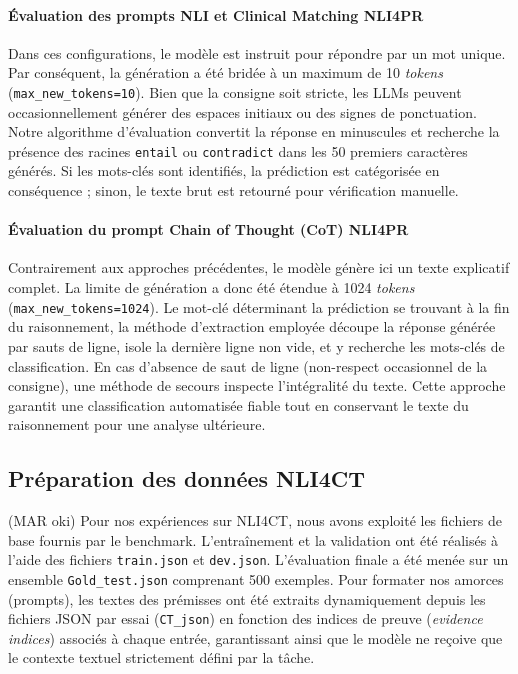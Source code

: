 \paragraph{Évaluation des prompts NLI et Clinical Matching NLI4PR}
Dans ces configurations, le modèle est instruit pour répondre par un mot unique. Par conséquent, la génération a été bridée à un maximum de 10 \textit{tokens} (\texttt{max\_new\_tokens=10}). Bien que la consigne soit stricte, les LLMs peuvent occasionnellement générer des espaces initiaux ou des signes de ponctuation. Notre algorithme d'évaluation convertit la réponse en minuscules et recherche la présence des racines \texttt{entail} ou \texttt{contradict} dans les 50 premiers caractères générés. Si les mots-clés sont identifiés, la prédiction est catégorisée en conséquence ; sinon, le texte brut est retourné pour vérification manuelle.

\paragraph{Évaluation du prompt Chain of Thought (CoT) NLI4PR}
Contrairement aux approches précédentes, le modèle génère ici un texte explicatif complet. La limite de génération a donc été étendue à 1024 \textit{tokens} (\texttt{max\_new\_tokens=1024}). Le mot-clé déterminant la prédiction se trouvant à la fin du raisonnement, la méthode d'extraction employée découpe la réponse générée par sauts de ligne, isole la dernière ligne non vide, et y recherche les mots-clés de classification. En cas d'absence de saut de ligne (non-respect occasionnel de la consigne), une méthode de secours inspecte l'intégralité du texte. Cette approche garantit une classification automatisée fiable tout en conservant le texte du raisonnement pour une analyse ultérieure.

\subsection{Préparation des données NLI4CT} (MAR oki)
Pour nos expériences sur NLI4CT, nous avons exploité les fichiers de base fournis par le benchmark. L'entraînement et la validation ont été réalisés à l'aide des fichiers \texttt{train.json} et \texttt{dev.json}. L'évaluation finale a été menée sur un ensemble \texttt{Gold\_test.json} comprenant 500 exemples. Pour formater nos amorces (prompts), les textes des prémisses ont été extraits dynamiquement depuis les fichiers JSON par essai (\texttt{CT\_json}) en fonction des indices de preuve (\textit{evidence indices}) associés à chaque entrée, garantissant ainsi que le modèle ne reçoive que le contexte textuel strictement défini par la tâche.

